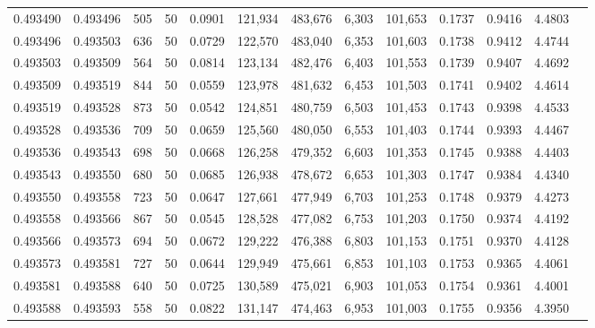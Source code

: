 \begin{tabular}{rrrrrrrrrrrrr}
0.493490 & 0.493496 &   505 &  50 &                                     0.0901 & 121,934 & 483,676 &   6,303 & 101,653 & 0.1737 & 0.9416 & 4.4803 \\
0.493496 & 0.493503 &   636 &  50 &                                     0.0729 & 122,570 & 483,040 &   6,353 & 101,603 & 0.1738 & 0.9412 & 4.4744 \\
0.493503 & 0.493509 &   564 &  50 &                                     0.0814 & 123,134 & 482,476 &   6,403 & 101,553 & 0.1739 & 0.9407 & 4.4692 \\
0.493509 & 0.493519 &   844 &  50 &                                     0.0559 & 123,978 & 481,632 &   6,453 & 101,503 & 0.1741 & 0.9402 & 4.4614 \\
0.493519 & 0.493528 &   873 &  50 &                                     0.0542 & 124,851 & 480,759 &   6,503 & 101,453 & 0.1743 & 0.9398 & 4.4533 \\
0.493528 & 0.493536 &   709 &  50 &                                     0.0659 & 125,560 & 480,050 &   6,553 & 101,403 & 0.1744 & 0.9393 & 4.4467 \\
0.493536 & 0.493543 &   698 &  50 &                                     0.0668 & 126,258 & 479,352 &   6,603 & 101,353 & 0.1745 & 0.9388 & 4.4403 \\
0.493543 & 0.493550 &   680 &  50 &                                     0.0685 & 126,938 & 478,672 &   6,653 & 101,303 & 0.1747 & 0.9384 & 4.4340 \\
0.493550 & 0.493558 &   723 &  50 &                                     0.0647 & 127,661 & 477,949 &   6,703 & 101,253 & 0.1748 & 0.9379 & 4.4273 \\
0.493558 & 0.493566 &   867 &  50 &                                     0.0545 & 128,528 & 477,082 &   6,753 & 101,203 & 0.1750 & 0.9374 & 4.4192 \\
0.493566 & 0.493573 &   694 &  50 &                                     0.0672 & 129,222 & 476,388 &   6,803 & 101,153 & 0.1751 & 0.9370 & 4.4128 \\
0.493573 & 0.493581 &   727 &  50 &                                     0.0644 & 129,949 & 475,661 &   6,853 & 101,103 & 0.1753 & 0.9365 & 4.4061 \\
0.493581 & 0.493588 &   640 &  50 &                                     0.0725 & 130,589 & 475,021 &   6,903 & 101,053 & 0.1754 & 0.9361 & 4.4001 \\
0.493588 & 0.493593 &   558 &  50 &                                     0.0822 & 131,147 & 474,463 &   6,953 & 101,003 & 0.1755 & 0.9356 & 4.3950 \\

\end{tabular}
